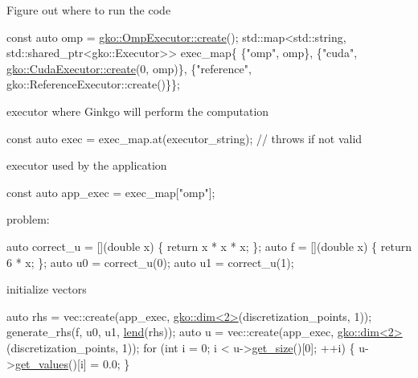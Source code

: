 Figure out where to run the code


\begin{DoxyCode}
\textcolor{keyword}{const} \textcolor{keyword}{auto} omp = \hyperlink{classgko_1_1OmpExecutor_a33ca05fdd0fc928ee262fc9425304874}{gko::OmpExecutor::create}();
std::map<std::string, std::shared\_ptr<gko::Executor>> exec\_map\{
    \{\textcolor{stringliteral}{"omp"}, omp\},
    \{\textcolor{stringliteral}{"cuda"}, \hyperlink{classgko_1_1CudaExecutor_a2718a92034350650ef406ffdb60db090}{gko::CudaExecutor::create}(0, omp)\},
    \{\textcolor{stringliteral}{"reference"}, gko::ReferenceExecutor::create()\}\};
\end{DoxyCode}


executor where Ginkgo will perform the computation


\begin{DoxyCode}
\textcolor{keyword}{const} \textcolor{keyword}{auto} exec = exec\_map.at(executor\_string);  \textcolor{comment}{// throws if not valid}
\end{DoxyCode}


executor used by the application


\begin{DoxyCode}
\textcolor{keyword}{const} \textcolor{keyword}{auto} app\_exec = exec\_map[\textcolor{stringliteral}{"omp"}];
\end{DoxyCode}


problem\+:


\begin{DoxyCode}
\textcolor{keyword}{auto} correct\_u = [](\textcolor{keywordtype}{double} x) \{ \textcolor{keywordflow}{return} x * x * x; \};
\textcolor{keyword}{auto} f = [](\textcolor{keywordtype}{double} x) \{ \textcolor{keywordflow}{return} 6 * x; \};
\textcolor{keyword}{auto} u0 = correct\_u(0);
\textcolor{keyword}{auto} u1 = correct\_u(1);
\end{DoxyCode}


initialize vectors


\begin{DoxyCode}
\textcolor{keyword}{auto} rhs = vec::create(app\_exec, \hyperlink{structgko_1_1dim}{gko::dim<2>}(discretization\_points, 1));
generate\_rhs(f, u0, u1, \hyperlink{namespacegko_aa8cb4876b72e5e1036ea9575443c439b}{lend}(rhs));
\textcolor{keyword}{auto} u = vec::create(app\_exec, \hyperlink{structgko_1_1dim}{gko::dim<2>}(discretization\_points, 1));
\textcolor{keywordflow}{for} (\textcolor{keywordtype}{int} i = 0; i < u->\hyperlink{classgko_1_1LinOp_a31b3c003388eb0b95393154f68c2b98d}{get\_size}()[0]; ++i) \{
    u->\hyperlink{classgko_1_1matrix_1_1Dense_a3bc458e02fab8e4c9f60f70bd4d5a4f9}{get\_values}()[i] = 0.0;
\}
\end{DoxyCode}


